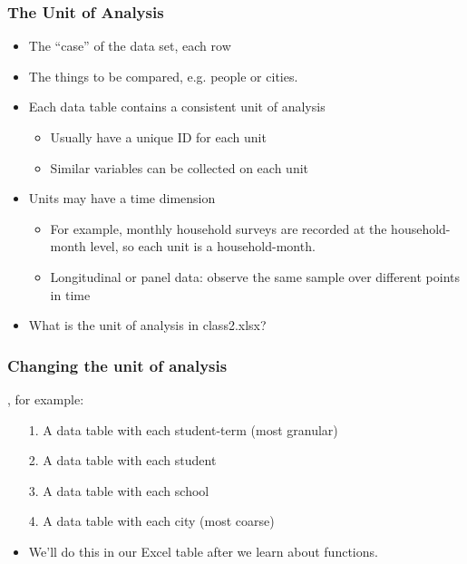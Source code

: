 \documentclass[11pt]{beamer}
\begin{document}
\begin{frame}
\frametitle{The Unit of Analysis}
\begin{itemize}
	\item The ``case'' of the data set, each \alert{row} 
	\item The things to be compared, e.g. people or cities. \pause
	\item \alert{Each data table contains a consistent unit of analysis} \pause
	\begin{itemize}
		\item Usually have a unique ID for each unit 
		\item Similar variables can be collected on each unit
	\end{itemize} \pause
	\item Units may have a time dimension \pause
	\begin{itemize}
		\item For example, monthly household surveys are recorded at the household-month level, so each unit is a household-month.
		\item \alert{Longitudinal} or \alert{panel data}: observe the same sample over different points in time
	\end{itemize} \pause \bigskip
	\item What is the unit of analysis in class2.xlsx? 
\end{itemize}
\end{frame}

\begin{frame}
\frametitle{Changing the unit of analysis}
, for example:
\begin{enumerate}
\item[1.] A data table with each \alert{student-term} (most granular)
\item[2.] A data table with each \alert{student}
\item[3.] A data table with each \alert{school}
\item[4.] A data table with each \alert{city} (most coarse)
\end{enumerate}\pause
\bigskip
{} \pause
\begin{itemize}
	\item We'll do this in our Excel table after we learn about functions.
\end{itemize}
\end{frame}
\end{document}
